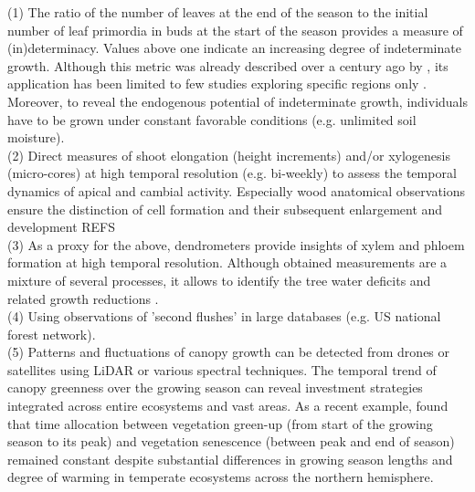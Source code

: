 \documentclass{article}
\begin{document}
	(1) The ratio of the number of leaves at the end of the season to the initial number of leaf primordia in buds at the start of the season provides a measure of (in)determinacy. Values above one indicate an increasing degree of indeterminate growth. Although this metric was already described over a century ago by \citet{mooreStudyWinterBuds1909}, its application has been limited to few studies exploring specific regions only \citep{damascosBudCompositionBranching2005, kikuzawaLeafSurvivalWoody1983, guedonRelativeExtentsPreformation2006}. Moreover, to reveal the endogenous potential of indeterminate growth, individuals have to be grown under constant favorable conditions (e.g. unlimited soil moisture).\\
	
	(2) Direct measures of shoot elongation (height increments) and/or xylogenesis (micro-cores) at high temporal resolution (e.g. bi-weekly) to assess the temporal dynamics of apical and cambial activity. Especially wood anatomical observations ensure the distinction of cell formation and their subsequent enlargement and development REFS\\
	
	(3) As a proxy for the above, dendrometers provide insights of xylem and phloem formation at high temporal resolution. Although obtained measurements are a mixture of several processes, it allows to identify the tree water deficits and related growth reductions \cite{etzoldNumberGrowthDays2021, zweifelWhyTreesGrow2021}. \\
	
	(4) Using observations of 'second flushes' in large databases (e.g. US national forest network). \\%
	
	(5) Patterns and fluctuations of canopy growth can be detected from drones or satellites using LiDAR or various spectral techniques. The temporal trend of canopy greenness over the growing season can reveal investment strategies integrated across entire ecosystems and vast areas. As a recent example, \citet{mengConsistentTimeAllocation2024} found that time allocation between vegetation green-up (from start of the growing season to its peak) and vegetation senescence (between peak and end of season) remained constant despite substantial differences in growing season lengths and degree of warming in temperate ecosystems across the northern hemisphere.  %
\end{document}
